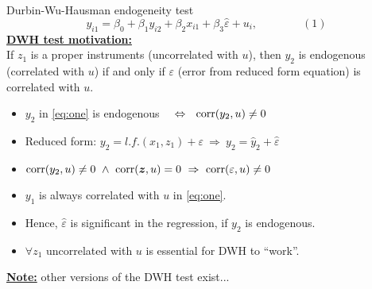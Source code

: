 \documentclass[usenames,dvipsnames]{beamer}
\begin{document}
\begin{frame}{Durbin-Wu-Hausman endogeneity test}
$$y_{i1}=\beta_0+\beta_1 y_{i2} + \beta_2 x_{i1} + \beta_3 \hat{\varepsilon} + u_i, \qquad \qquad (1)$$
\medskip
\textbf{\underline{DWH test motivation:}} \\If $z_1$ is a proper instruments (uncorrelated with $u$), then $y_2$ is endogenous (correlated with $u$) if and only if $\varepsilon$ (error from reduced form equation) is correlated with $u$. \\
\medskip
\begin{itemize}
\item $y_2$ in \eqref{eq:one} is endogenous ~~$\Leftrightarrow ~~\textnormal{corr}(y_2,u)\neq0$
\item Reduced form: $y_2 = \textit{l.f.}(x_1, z_1) + \varepsilon ~\Rightarrow~ y_2 = \hat{y}_2 + \hat{\varepsilon}$
\item $\textnormal{corr}(y_2,u)\neq0 ~\wedge~\textnormal{corr}(\bm{z},u) = 0 ~\Rightarrow~ \textnormal{corr}(\varepsilon,u)\neq0 $
\item $y_1$ is always correlated with $u$ in \eqref{eq:one}. 
\item Hence, $\hat{\varepsilon}$ is significant in the regression, if $y_2$ is endogenous.
\item $\forall z_1$ uncorrelated with $u$ is essential for DWH to ``work''.
\end{itemize}
\bigskip
\textbf{\underline{Note:}} other versions of the DWH test exist...
\end{frame}
\end{document}
